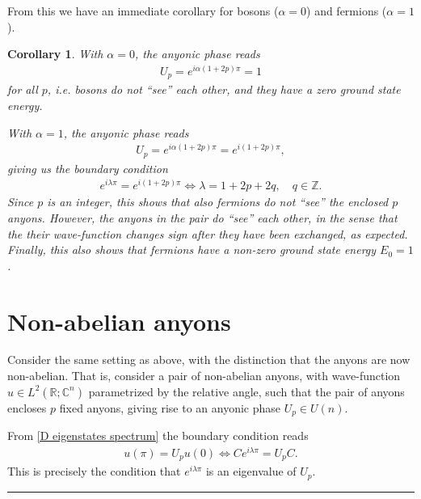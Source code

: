 \documentclass[a4paper,10pt,oneside]{book}
\theoremstyle{plain}
\newtheorem{corollary}[theorem]{Corollary}
\theoremstyle{definition}
\theoremstyle{remark}
\begin{document}
{From this we have an immediate corollary for bosons ($\alpha = 0$) and fermions ($\alpha = 1$).

\begin{corollary}
  With $\alpha = 0$, the anyonic phase reads
  \begin{align*}
    U_p = e^{i\alpha(1+2p)\pi} = 1
  \end{align*}
  for all $p$, i.e. bosons do not ``see'' each other, and they have a zero ground state energy.

  With $\alpha = 1$, the anyonic phase reads
  \begin{align*}
    U_p = e^{i\alpha(1+2p)\pi} = e^{i(1+2p)\pi},
  \end{align*}
  giving us the boundary condition
  \begin{align*}
    e^{i\lambda \pi} = e^{i(1+2p)\pi} \iff \lambda = 1 + 2p + 2q, \quad q \in \mathbb{Z}.
  \end{align*}
  Since $p$ is an integer, this shows that also fermions do not ``see'' the enclosed $p$ anyons.
  However, the anyons in the pair do ``see'' each other, in the sense that the their wave-function changes sign after they have been exchanged, as expected. Finally, this also shows that fermions have a non-zero ground state energy $E_0 = 1$.
\end{corollary}












\section{Non-abelian anyons}

Consider the same setting as above, with the distinction that the anyons are now non-abelian. That is, consider a pair of non-abelian anyons, with wave-function $u \in L^2(\mathbb{R}; \mathbb{C}^n)$ parametrized by the relative angle, such that the pair of anyons encloses $p$ fixed anyons, giving rise to an anyonic phase $U_p \in U(n)$.

From \cref{D eigenstates spectrum} the boundary condition reads
\begin{align*}
  u(\pi) = U_p u(0) \iff C e^{i\lambda\pi} = U_p C.
\end{align*}
This is precisely the condition that $e^{i\lambda\pi}$ is an eigenvalue of $U_p$.


\hrule

}
\end{document}
